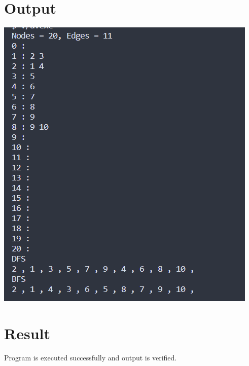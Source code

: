 \section{Output}
\includegraphics[]{Cycle_2/Outputs/GraphAdjMatrix.png}

\section{Result}
Program is executed successfully and output is verified.